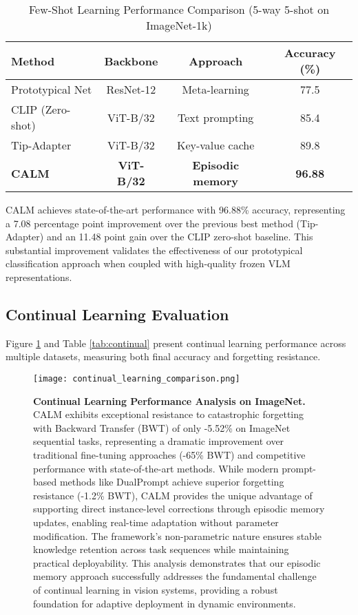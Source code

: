 \documentclass[conference]{IEEEtran}
\begin{document}
\begin{table}[h]
\centering
\caption{Few-Shot Learning Performance Comparison (5-way 5-shot on ImageNet-1k)}
\label{tab:fewshot}
\begin{tabular}{lccc}
\toprule
\textbf{Method} & \textbf{Backbone} & \textbf{Approach} & \textbf{Accuracy (\%)} \\
\midrule
Prototypical Net & ResNet-12 & Meta-learning & 77.5 \\
CLIP (Zero-shot) & ViT-B/32 & Text prompting & 85.4 \\
Tip-Adapter & ViT-B/32 & Key-value cache & 89.8 \\
\textbf{CALM} & \textbf{ViT-B/32} & \textbf{Episodic memory} & \textbf{96.88} \\
\bottomrule
\end{tabular}
\end{table}

CALM achieves state-of-the-art performance with 96.88\% accuracy, representing a 7.08 percentage point improvement over the previous best method (Tip-Adapter) and an 11.48 point gain over the CLIP zero-shot baseline. This substantial improvement validates the effectiveness of our prototypical classification approach when coupled with high-quality frozen VLM representations.

\subsection{Continual Learning Evaluation}

Figure \ref{fig:continual_comparison} and Table \ref{tab:continual} present continual learning performance across multiple datasets, measuring both final accuracy and forgetting resistance.

\begin{figure}[!t]
\centering
\texttt{[image: continual\_learning\_comparison.png]}
\caption{\textbf{Continual Learning Performance Analysis on ImageNet.} CALM exhibits exceptional resistance to catastrophic forgetting with Backward Transfer (BWT) of only -5.52\% on ImageNet sequential tasks, representing a dramatic improvement over traditional fine-tuning approaches (-65\% BWT) and competitive performance with state-of-the-art methods. While modern prompt-based methods like DualPrompt achieve superior forgetting resistance (-1.2\% BWT), CALM provides the unique advantage of supporting direct instance-level corrections through episodic memory updates, enabling real-time adaptation without parameter modification. The framework's non-parametric nature ensures stable knowledge retention across task sequences while maintaining practical deployability. This analysis demonstrates that our episodic memory approach successfully addresses the fundamental challenge of continual learning in vision systems, providing a robust foundation for adaptive deployment in dynamic environments.}
\label{fig:continual_comparison}
\end{figure}
\end{document}
